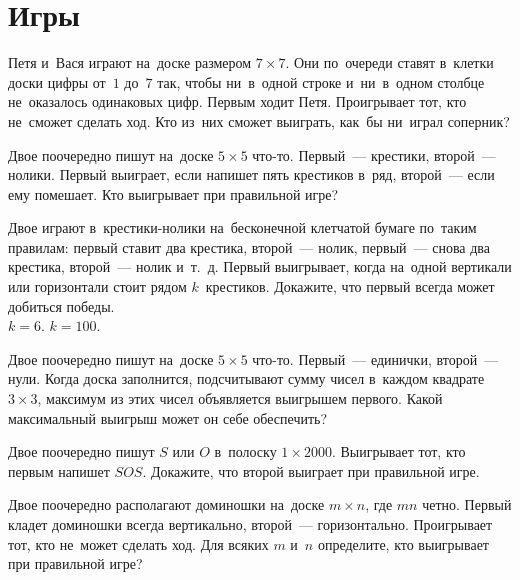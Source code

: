 
\section*{Игры}


\begin{problems}

\item
Петя и~Вася играют на~доске размером $7 \times 7$.
Они по~очереди ставят в~клетки доски цифры от~$1$ до~$7$ так, чтобы ни~в~одной
строке и~ни~в~одном столбце не~оказалось одинаковых цифр.
Первым ходит Петя.
Проигрывает тот, кто не~сможет сделать ход.
Кто из~них сможет выиграть, как~бы ни~играл соперник?

\item
Двое поочередно пишут на~доске $5 \times 5$ что-то.
Первый~--- крестики, второй~--- нолики.
Первый выиграет, если напишет пять крестиков в~ряд, второй~--- если ему
помешает.
Кто выигрывает при правильной игре?

\item
Двое играют в~крестики-нолики на~бесконечной клетчатой бумаге по~таким
правилам: первый ставит два крестика, второй~--- нолик, первый~--- снова два
крестика, второй~--- нолик и~т.~д.
Первый выигрывает, когда на~одной вертикали или горизонтали стоит рядом
$k$~крестиков.
Докажите, что первый всегда может добиться победы.
\\
\subproblem $k = 6$.
\qquad
\subproblem $k = 100$.

\item
Двое поочередно пишут на~доске $5 \times 5$ что-то.
Первый~--- единички, второй~--- нули.
Когда доска заполнится, подсчитывают сумму чисел в~каждом
квадрате $3 \times 3$, максимум из этих чисел объявляется выигрышем первого.
Какой максимальный выигрыш может он себе обеспечить?

\item
Двое поочередно пишут $S$ или $O$ в~полоску $1 \times 2000$.
Выигрывает тот, кто первым напишет $SOS$.
Докажите, что второй выиграет при правильной игре.

\item
Двое поочередно располагают доминошки на~доске $m \times n$, где $m n$ четно.
Первый кладет доминошки всегда вертикально, второй~--- горизонтально.
Проигрывает тот, кто не~может сделать ход.
Для всяких $m$ и~$n$ определите, кто выигрывает при правильной игре?

\end{problems}

